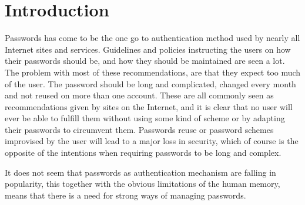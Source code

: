 \chapter{Introduction}
\label{chp:intro} 

Passwords has come to be the one go to authentication method used by nearly all Internet sites and services. Guidelines and policies instructing the users on how their passwords should be, and how they should be maintained are seen a lot. The problem with most of these recommendations, are that they expect too much of the user. The password should be long and complicated, changed every month and not reused on more than one account. These are all commonly seen as recommendations given by sites on the Internet, and it is clear that no user will ever be able to fulfill them without using some kind of scheme or by adapting their passwords to circumvent them. Passwords reuse or password schemes improvised by the user will lead to a major loss in security, which of course is the opposite of the intentions when requiring passwords to be long and complex.  
\par It does not seem that passwords as authentication mechanism are falling in popularity, this together with the obvious limitations of the human memory, means that there is a need for strong ways of managing passwords. 


